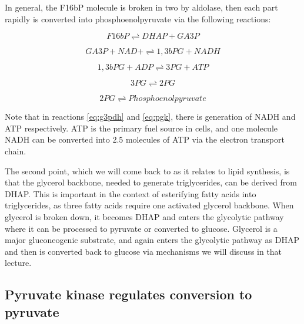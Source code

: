 \documentclass{tufte-handout}
\begin{document}
  In general, the F16bP molecule is broken in two by aldolase, then each part rapidly is converted into phosphoenolpyruvate via the following reactions:

\begin{equation}\label{eq:aldolase-a}
F16bP \rightleftharpoons DHAP+ GA3P
\end{equation}

\begin{equation}\label{eq:g3pdh}
GA3P + NAD+ \rightleftharpoons 1,3bPG  + NADH
\end{equation}

\begin{equation}\label{eq:pgk}
1,3bPG + ADP \rightleftharpoons 3PG + ATP
\end{equation}

\begin{equation}
3PG \rightleftharpoons 2PG
\end{equation}

\begin{equation}
2PG \rightleftharpoons Phosphoenolpyruvate
\end{equation}

Note that in reactions \ref{eq:g3pdh} and \ref{eq:pgk}, there is generation of NADH and ATP respectively.  ATP is the primary fuel source in cells, and one molecule NADH can be converted into 2.5 molecules of ATP via the electron transport chain.  

The second point, which we will come back to as it relates to lipid synthesis, is that the glycerol backbone, needed to generate triglycerides, can be derived from DHAP.  This is important in the context of esterifying fatty acids into triglycerides, as three fatty acids require one activated glycerol backbone.  When glycerol is broken down, it becomes DHAP and enters the glycolytic pathway where it can be processed to pyruvate or converted to glucose.  Glycerol is a major gluconeogenic substrate, and again enters the glycolytic pathway as DHAP and then is converted back to glucose via mechanisms we will discuss in that lecture.

\subsection{Pyruvate kinase regulates conversion to pyruvate}
\end{document}

